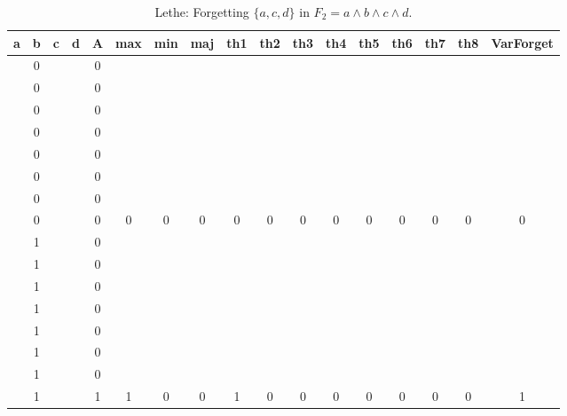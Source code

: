 \begin{table}[!tb]
    \centering
    \begin{tabular}{|c|c|c|c|c|c|c|c|c|c|c|c|c|c|c|c|c|}
        \hline
        \textbf{a} & \textbf{b} & \textbf{c} & \textbf{d} & \textbf{A} & \textbf{max} & \textbf{min} & \textbf{maj} & \textbf{th1} & \textbf{th2} & \textbf{th3} & \textbf{th4} & \textbf{th5} & \textbf{th6} & \textbf{th7} & \textbf{th8} & \textbf{VarForget} \\ \hline
        \rowcolor{gray!40}  & 0 &  &  & 0 &  &  &  &  &  &  &  &  &  &  &  &  \\ \hline
        \rowcolor{gray!40}  & 0 &  &  & 0 &  &  &  &  &  &  &  &  &  &  &  &  \\ \hline
        \rowcolor{gray!40}  & 0 &  &  & 0 &  &  &  &  &  &  &  &  &  &  &  &  \\ \hline
        \rowcolor{gray!40}  & 0 &  &  & 0 &  &  &  &  &  &  &  &  &  &  &  &  \\ \hline
        \rowcolor{gray!40}  & 0 &  &  & 0 &  &  &  &  &  &  &  &  &  &  &  &  \\ \hline
        \rowcolor{gray!40}  & 0 &  &  & 0 &  &  &  &  &  &  &  &  &  &  &  &  \\ \hline
        \rowcolor{gray!40}  & 0 &  &  & 0 &  &  &  &  &  &  &  &  &  &  &  &  \\ \hline
        \rowcolor{gray!40}  & 0 &  &  & 0 & 0 & 0 & 0 & 0 & 0 & 0 & 0 & 0 & 0 & 0 & 0 & 0 \\ \hline
        \rowcolor{blue!40}  & 1 &  &  & 0 &  &  &  &  &  &  &  &  &  &  &  &  \\ \hline
        \rowcolor{blue!40}  & 1 &  &  & 0 &  &  &  &  &  &  &  &  &  &  &  &  \\ \hline
        \rowcolor{blue!40}  & 1 &  &  & 0 &  &  &  &  &  &  &  &  &  &  &  &  \\ \hline
        \rowcolor{blue!40}  & 1 &  &  & 0 &  &  &  &  &  &  &  &  &  &  &  &  \\ \hline
        \rowcolor{blue!40}  & 1 &  &  & 0 &  &  &  &  &  &  &  &  &  &  &  &  \\ \hline
        \rowcolor{blue!40}  & 1 &  &  & 0 &  &  &  &  &  &  &  &  &  &  &  &  \\ \hline
        \rowcolor{blue!40}  & 1 &  &  & 0 &  &  &  &  &  &  &  &  &  &  &  &  \\ \hline
        \rowcolor{blue!40}  & 1 &  &  & 1 & 1 & 0 & 0 & 1 & 0 & 0 & 0 & 0 & 0 & 0 & 0 & 1 \\ \hline
    \end{tabular}
    \caption{Lethe: Forgetting $\{a, c, d\}$ in $F_{2} = a \land b \land c \land d$.}
    \label{tab:lethe-F2-acd}
\end{table}
